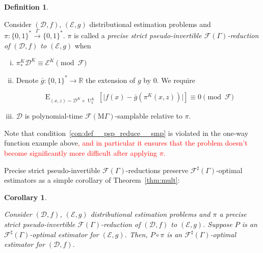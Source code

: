 \documentclass[11pt]{article}
\numberwithin{equation}{section}
\theoremstyle{definition}
\newtheorem{definition}{Definition}[section]
\theoremstyle{plain}
\newtheorem{corollary}{Corollary}[section]
\newcommand{\Bool}{\{0,1\}}
\newcommand{\Words}{{\Bool^*}}
\DeclareMathOperator{\E}{E}
\DeclareMathOperator{\Un}{U}
\newcommand{\Reals}{\mathbb{R}}
\newcommand{\Abs}[1]{\lvert #1 \rvert}
\newcommand{\Dist}{\mathcal{D}}
\newcommand{\MGrow}{\mathrm{M}\Gamma}
\newcommand{\Fall}{\mathcal{F}}
\newcommand{\EG}{\Fall(\Gamma)}
\newcommand{\ESG}{\Fall^\sharp(\Gamma)}
\newcommand{\EMG}{\Fall(\MGrow)}
\newcommand{\Scheme}{\xrightarrow{\Gamma}}
\begin{document}
\begin{samepage}
\begin{definition}
\label{def:psp_reduce}

Consider $(\Dist,f)$, $(\mathcal{E},g)$ distributional estimation problems and ${\pi: \Words \Scheme \Words}$. $\pi$ is called a \emph{precise strict pseudo-invertible $\EG$-reduction of $(\Dist,f)$ to $(\mathcal{E},g)$} when

\begin{enumerate}[(i)]

\item\label{con:def__psp_reduce__dist} $\pi_*^K\Dist^{K} \equiv \mathcal{E}^{K} \pmod \Fall$

\item\label{con:def__psp_reduce__fun} Denote ${\bar{g}: \Words \rightarrow \Reals}$ the extension of $g$ by 0. We require

\[\E_{(x,z) \sim \Dist^{K} \times \Un_\pi^{K}}[\Abs{f(x)-\bar{g}(\pi^{K}(x,z))}] \equiv 0 \pmod \Fall\]

\item\label{con:def__psp_reduce__smp} $\Dist$ is polynomial-time $\EMG$-samplable relative to $\pi$.

\end{enumerate}

\end{definition}
\end{samepage}

Note that condition~\ref{con:def__psp_reduce__smp} is violated in the one-way function example above\textcolor{red}{, and in particular it ensures that the problem doesn't become significantly more difficult after applying $\pi$.}

Precise strict pseudo-invertible $\EG$-reductions preserve $\ESG$-optimal estimators as a simple corollary of Theorem~\ref{thm:mult}:

\begin{samepage}
\begin{corollary}
\label{crl:psp_reduce_sharp}

Consider $(\Dist,f)$, $(\mathcal{E},g)$ distributional estimation problems and $\pi$ a precise strict pseudo-invertible $\EG$-reduction of $(\Dist, f)$ to $(\mathcal{E}, g)$. Suppose $P$ is an $\ESG$-optimal estimator for $(\mathcal{E}, g)$. Then, $P \circ \pi$ is an $\ESG$-optimal estimator for $(\Dist, f)$.

\end{corollary}
\end{samepage}
\end{document}
